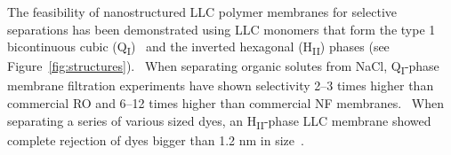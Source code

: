 \documentclass{article}
\begin{document}
  The feasibility of nanostructured LLC polymer membranes for selective separations
  has been demonstrated using LLC monomers that form the type 1 bicontinuous cubic
  (Q\textsubscript{I})~\cite{hatakeyama_water_2011,hatakeyama_nanoporous_2010,carter_glycerol-based_2012}
  and the inverted hexagonal (H\textsubscript{II}) 
  phases (see Figure~\ref{fig:structures}).~\cite{zhou_supported_2005} When separating organic solutes from NaCl, Q\textsubscript{I}-phase
  membrane filtration experiments have shown selectivity 2--3 times higher than
  commercial RO and 6--12 times higher than commercial NF membranes.~\cite{dischinger_application_2017}
  When separating a series of various sized dyes, an H\textsubscript{II}-phase 
  LLC membrane showed complete rejection of dyes bigger than 1.2 nm in size~\cite{zhou_supported_2005}.

\end{document}
